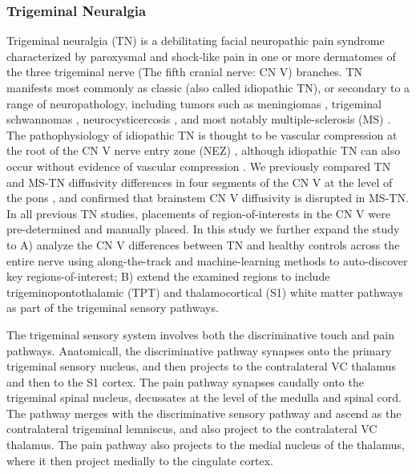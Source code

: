 \subsubsection{Trigeminal Neuralgia}
Trigeminal neuralgia (TN) is a debilitating facial neuropathic pain syndrome characterized by paroxysmal and shock-like pain in one or more dermatomes of the three trigeminal nerve (The fifth cranial nerve: CN V) branches. TN manifests most commonly as classic (also called idiopathic TN), or secondary to a range of neuropathology, including tumors such as meningiomas \cite{Cheng2008}, trigeminal schwannomas \cite{Miller2008}, neurocysticercosis \cite{Revuelta1995}, and most notably multiple-sclerosis (MS) \cite{Cruccu2009,VanderMeijs2002,Nick2012}. The pathophysiology of idiopathic TN is thought to be vascular compression at the root of the CN V nerve entry zone (NEZ) \cite{Linn2011,Love2001}, although idiopathic TN can also occur without evidence of vascular compression \cite{Lee2014}. We previously compared TN and MS-TN diffusivity differences in four segments of the CN V at the level of the pons \cite{Chen2016a}, and confirmed that brainstem CN V diffusivity is disrupted in MS-TN. In all previous TN studies, placements of region-of-interests in the CN V were pre-determined and manually placed. In this study we further expand the study to A) analyze the CN V differences between TN and healthy controls across the entire nerve using along-the-track and machine-learning methods to auto-discover key regions-of-interest; B) extend the examined regions to include trigeminopontothalamic (TPT) and thalamocortical (S1) white matter pathways as part of the trigeminal sensory pathways.

The trigeminal sensory system involves both the discriminative touch and pain pathways. Anatomicall, the discriminative pathway synapses onto the primary trigeminal sensory nucleus, and then projects to the contralateral VC thalamus and then to the S1 cortex. The pain pathway synapses caudally onto the trigeminal spinal nucleus, decussates at the level of the medulla and spinal cord. The pathway merges with the discriminative sensory pathway and ascend as the contralateral trigeminal lemniscus, and also project to the contralateral VC thalamus. The pain pathway also projects to the medial nucleus of the thalamus, where it then project medially to the cingulate cortex. 

